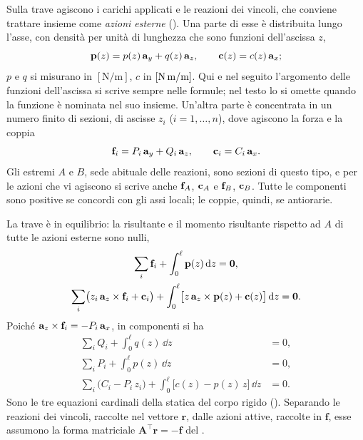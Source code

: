 Sulla trave agiscono i carichi applicati e le reazioni
dei vincoli, che conviene trattare insieme come
\emph{azioni esterne} ().
Una parte di esse è distribuita lungo l'asse, con
densità per unità di lunghezza che sono funzioni
dell'ascissa $z$,
\begin{equation}\label{eq:densita}
	\mathbf{p}(z) = p(z)\,\mathbf{a}_y + q(z)\,\mathbf{a}_z, \qquad
	\mathbf{c}(z) = c(z)\,\mathbf{a}_x;
\end{equation}
$p$ e $q$ si misurano in $[\text{N/m}]$, $c$ in
$[\text{N\,m/m}]$. Qui e nel seguito l'argomento delle
funzioni dell'ascissa si scrive sempre nelle formule; nel
testo lo si omette quando la funzione è nominata nel suo
insieme.
Un'altra parte è concentrata in un numero finito di
sezioni, di ascisse $z_i$ ($i = 1, \ldots, n$), dove
agiscono la forza e la coppia
\begin{equation}\label{eq:concentrate}
	\mathbf{f}_i = P_i\,\mathbf{a}_y + Q_i\,\mathbf{a}_z, \qquad
	\mathbf{c}_i = C_i\,\mathbf{a}_x.
\end{equation}
Gli estremi $A$ e $B$, sede abituale delle reazioni, sono
sezioni di questo tipo, e per le azioni che vi agiscono si
scrive anche $\mathbf{f}_A$, $\mathbf{c}_A$ e $\mathbf{f}_B$, $\mathbf{c}_B$. Tutte
le componenti sono positive se concordi con gli assi
locali; le coppie, quindi, se antiorarie.



La trave è in equilibrio: la
risultante e il momento risultante rispetto ad $A$ di
tutte le azioni esterne sono nulli,
\begin{gather*}
	\sum_{i} \mathbf{f}_i + \int_0^\ell \mathbf{p}(z)\,\mathrm{d} z = \mathbf{0},
	\\
	\sum_{i} \bigl(z_i\,\mathbf{a}_z \times \mathbf{f}_i + \mathbf{c}_i\bigr)
	+ \int_0^\ell \bigl[z\,\mathbf{a}_z \times \mathbf{p}(z) + \mathbf{c}(z)\bigr]\,\mathrm{d} z = \mathbf{0}.
\end{gather*}
Poiché $\mathbf{a}_z \times \mathbf{f}_i = -P_i\,\mathbf{a}_x$, in componenti
si ha
\begin{align}
	\sum_{i} Q_i + \int_0^\ell q(z)\,\dd z &= 0,
	\label{eq:eq_glob_z}\\
	\sum_{i} P_i + \int_0^\ell p(z)\,\dd z &= 0,
	\label{eq:eq_glob_y}\\
	\sum_{i} \bigl(C_i - P_i\,z_i\bigr)
	+ \int_0^\ell \bigl[c(z) - p(z)\,z\bigr]\,\dd z &= 0.
	\label{eq:eq_glob_mu}
\end{align}
Sono le tre equazioni cardinali della statica del corpo
rigido (). Separando le reazioni
dei vincoli, raccolte nel vettore $\bm{r}$, dalle azioni
attive, raccolte in $\bm{f}$, esse assumono la forma
matriciale $\bm{A}^{\top}\bm{r} = -\bm{f}$ del
.



